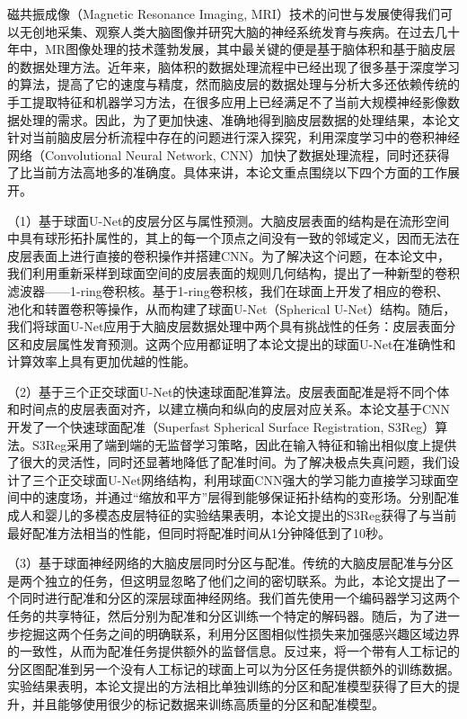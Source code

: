 \cleardoublepage
{}
磁共振成像（Magnetic Resonance Imaging, MRI）技术的问世与发展使得我们可以无创地采集、观察人类大脑图像并研究大脑的神经系统发育与疾病。在过去几十年中，MR图像处理的技术蓬勃发展，其中最关键的便是基于脑体积和基于脑皮层的数据处理方法。近年来，脑体积的数据处理流程中已经出现了很多基于深度学习的算法，提高了它的速度与精度，然而脑皮层的数据处理与分析大多还依赖传统的手工提取特征和机器学习方法，在很多应用上已经满足不了当前大规模神经影像数据处理的需求。因此，为了更加快速、准确地得到脑皮层数据的处理结果，本论文针对当前脑皮层分析流程中存在的问题进行深入探究，利用深度学习中的卷积神经网络（Convolutional Neural Network, CNN）加快了数据处理流程，同时还获得了比当前方法高地多的准确度。具体来讲，本论文重点围绕以下四个方面的工作展开。

（1）基于球面U-Net的皮层分区与属性预测。大脑皮层表面的结构是在流形空间中具有球形拓扑属性的，其上的每一个顶点之间没有一致的邻域定义，因而无法在皮层表面上进行直接的卷积操作并搭建CNN。为了解决这个问题，在本论文中，我们利用重新采样到球面空间的皮层表面的规则几何结构，提出了一种新型的卷积滤波器——1-ring卷积核。基于1-ring卷积核，我们在球面上开发了相应的卷积、池化和转置卷积等操作，从而构建了球面U-Net（Spherical U-Net）结构。随后，我们将球面U-Net应用于大脑皮层数据处理中两个具有挑战性的任务：皮层表面分区和皮层属性发育预测。这两个应用都证明了本论文提出的球面U-Net在准确性和计算效率上具有更加优越的性能。

（2）基于三个正交球面U-Net的快速球面配准算法。皮层表面配准是将不同个体和时间点的皮层表面对齐，以建立横向和纵向的皮层对应关系。本论文基于CNN开发了一个快速球面配准（Superfast Spherical Surface Registration, S3Reg）算法。S3Reg采用了端到端的无监督学习策略，因此在输入特征和输出相似度上提供了很大的灵活性，同时还显著地降低了配准时间。为了解决极点失真问题，我们设计了三个正交球面U-Net网络结构，利用球面CNN强大的学习能力直接学习球面空间中的速度场，并通过“缩放和平方”层得到能够保证拓扑结构的变形场。分别配准成人和婴儿的多模态皮层特征的实验结果表明，本论文提出的S3Reg获得了与当前最好配准方法相当的性能，但同时将配准时间从1分钟降低到了10秒。

（3）基于球面神经网络的大脑皮层同时分区与配准。传统的大脑皮层配准与分区是两个独立的任务，但这明显忽略了他们之间的密切联系。为此，本论文提出了一个同时进行配准和分区的深层球面神经网络。我们首先使用一个编码器学习这两个任务的共享特征，然后分别为配准和分区训练一个特定的解码器。随后，为了进一步挖掘这两个任务之间的明确联系，利用分区图相似性损失来加强感兴趣区域边界的一致性，从而为配准任务提供额外的监督信息。反过来，将一个带有人工标记的分区图配准到另一个没有人工标记的球面上可以为分区任务提供额外的训练数据。实验结果表明，本论文提出的方法相比单独训练的分区和配准模型获得了巨大的提升，并且能够使用很少的标记数据来训练高质量的分区和配准模型。

